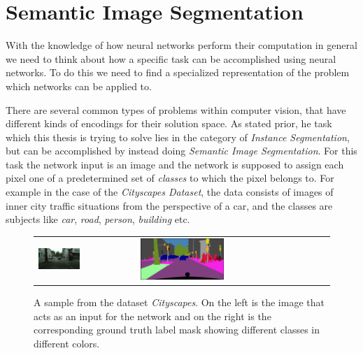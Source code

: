 \section{Semantic Image Segmentation}
\label{sec:imseg}

With the knowledge of how neural networks perform their computation in general we need to think about how a specific task can be accomplished using neural networks.
To do this we need to find a specialized representation of the problem which networks can be applied to.

There are several common types of problems within computer vision, that have different kinds of encodings for their solution space. As stated prior, he task which this thesis is trying to solve lies in the category of \emph{Instance Segmentation}, but can be accomplished by instead doing \emph{Semantic Image Segmentation}.
For this task the network input is an image and the network is supposed to assign each pixel one of a predetermined set of \emph{classes} to which the pixel belongs to. For example in the case of the \emph{Cityscapes Dataset}\cite{cordtsCityscapesDatasetSemantic2016a}, the data consists of images of inner city traffic situations from the perspective of a car, and the classes are subjects like \emph{car}, \emph{road}, \emph{person}, \emph{building} etc.

\begin{figure}[htbp]
    \centering
    \begin{tabular}{ll}
        \includegraphics[width=0.45\textwidth]{images/aachen_000029_000019_leftImg8bit.png}
        &
        \includegraphics[width=0.45\textwidth]{images/aachen_000029_000019_gtFine_color.png}
    \end{tabular}
    \caption{A sample from the dataset \emph{Cityscapes}. On the left is the image that acts as an input for the network and on the right is the corresponding ground truth label mask showing different classes in different colors. \cite{cordtsCityscapesDatasetSemantic2016a}}
    \label{fig:cityscapes_smpl}
\end{figure}

